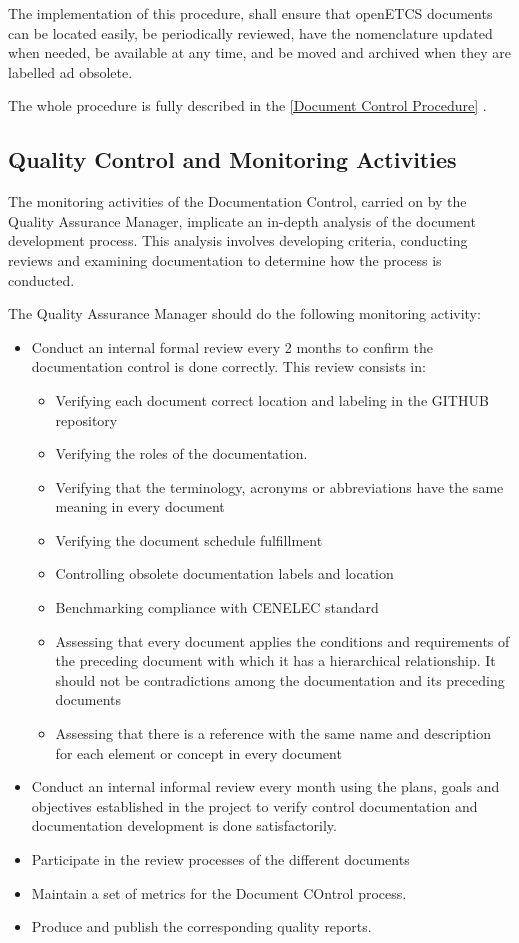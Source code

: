 \documentclass{template/openetcs_article}
\begin{document}
The implementation of this procedure, shall ensure that openETCS documents can be located easily, be periodically reviewed, have the nomenclature updated when needed, be available at any time, and be moved and archived when they are labelled ad obsolete.

The whole procedure is fully described in the \href{https://github.com/openETCS/governance/tree/master/Document%20Control%20Process}{[Document Control Procedure]} .

\subsection{Quality Control and Monitoring Activities}
The monitoring activities of the Documentation Control, carried on by the Quality Assurance Manager, implicate an in-depth analysis of the document development process. This analysis involves developing criteria, conducting reviews and examining documentation to determine how the process is conducted.

The Quality Assurance Manager should do the following monitoring activity:
\begin{itemize}
\item Conduct an internal formal review every 2 months to confirm the documentation control is done correctly. This review consists in:
\begin{itemize}
\item Verifying each document correct location and labeling in the GITHUB repository
\item Verifying the roles of the documentation.
\item Verifying that the terminology, acronyms or abbreviations have the same meaning in every document
\item Verifying the document schedule fulfillment
\item Controlling obsolete documentation labels and location
\item Benchmarking compliance with CENELEC standard
\item Assessing that every document applies the conditions and requirements of the preceding document with which it has a hierarchical relationship. It should not be contradictions among the documentation and its preceding documents
\item Assessing that there is a reference with the same name and description for each element or concept in every document
\end{itemize}
\item Conduct an internal informal review every month using the plans, goals and objectives established in the project to verify control documentation and documentation development is done satisfactorily.
\item Participate in the review processes of the different documents
\item Maintain a set of metrics for the Document COntrol process.
\item Produce and publish the corresponding quality reports.
\end{itemize}
\end{document}
